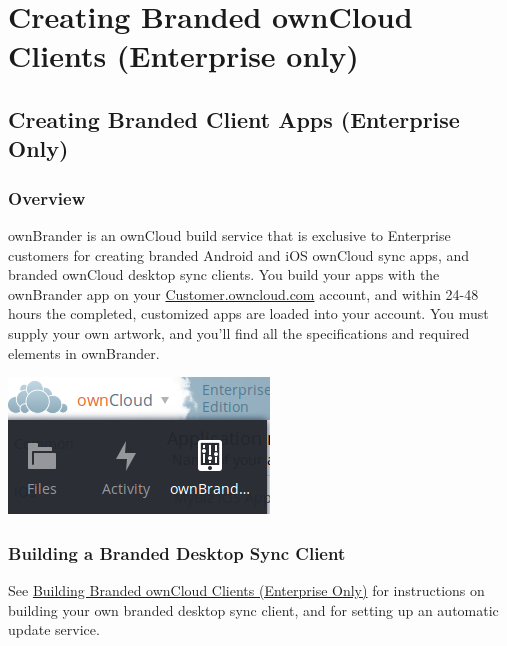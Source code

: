 \documentclass[letterpaper,10pt,english]{sphinxmanual}
\begin{document}
\section{Creating Branded ownCloud Clients (Enterprise only)}
\label{enterprise_clients/index:creating-branded-owncloud-clients-enterprise-only}\label{enterprise_clients/index::doc}

\subsection{Creating Branded Client Apps (Enterprise Only)}
\label{enterprise_clients/creating_branded_apps:creating-branded-client-apps-enterprise-only}\label{enterprise_clients/creating_branded_apps::doc}

\subsubsection{Overview}
\label{enterprise_clients/creating_branded_apps:overview}
ownBrander is an ownCloud build service that is exclusive to Enterprise
customers for creating branded Android and iOS ownCloud sync apps, and branded
ownCloud desktop sync clients. You build your apps with the
ownBrander app on your \href{https://customer.owncloud.com/owncloud/}{Customer.owncloud.com} account, and within 24-48 hours
the completed, customized apps are loaded into your account. You must supply
your own artwork, and you'll find all the specifications and required elements
in ownBrander.

\includegraphics{ownbrander-1.png}


\subsubsection{Building a Branded Desktop Sync Client}
\label{enterprise_clients/creating_branded_apps:building-a-branded-desktop-sync-client}
See \href{https://doc.owncloud.com/branded\_clients/}{Building Branded ownCloud Clients (Enterprise Only)} for instructions on
building your own branded desktop sync client, and for setting up an automatic
update service.
\end{document}
